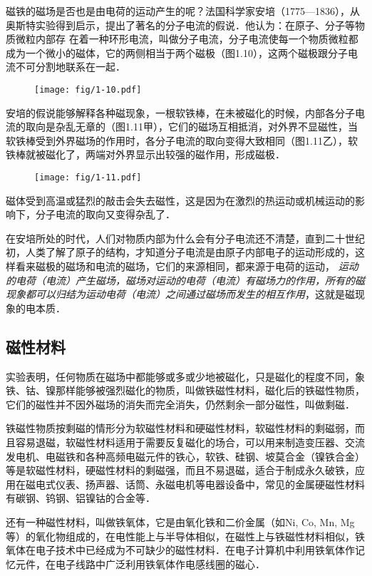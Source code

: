 磁铁的磁场是否也是由电荷的运动产生的呢？法国科学家安培（1775—1836），从奥斯特实验得到启示，提出了著名的分子电流的假说．他认为：在原子、分子等物质微粒内部存
在着一种环形电流，叫做分子电流，分子电流使每一个物质微粒都成为一个微小的磁体，它的两侧相当于两个磁极（图1.10），这两个磁极跟分子电流不可分割地联系在一起．

\begin{figure}[htp]\centering
\texttt{[image: fig/1-10.pdf]}
\caption{}
\end{figure}

安培的假说能够解释各种磁现象，一根软铁棒，在未被磁化的时候，内部各分子电流的取向是杂乱无章的（图1.11甲），它们的磁场互相抵消，对外界不显磁性，当软铁棒受到外界磁场的作用时，各分子电流的取向变得大致相同（图1.11乙），软铁棒就被磁化了，两端对外界显示出较强的磁作用，形成磁极．

\begin{figure}[htp]\centering
\texttt{[image: fig/1-11.pdf]}
\caption{}
\end{figure}

磁体受到高温或猛烈的敲击会失去磁性，这是因为在激烈的热运动或机械运动的影响下，分子电流的取向又变得杂乱了．

在安培所处的时代，人们对物质内部为什么会有分子电流还不清楚，直到二十世纪初，人类了解了原子的结构，才知道分子电流是由原子内部电子的运动形成的，这样看来磁极的磁场和电流的磁场，它们的来源相同，都来源于电荷的运动，
\textit{运动的电荷（电流）产生磁场，磁场对运动的电荷（电流）有磁场力的作用，所有的磁现象都可以归结为运动电荷（电流）之间通过磁场而发生的相互作用}，这就是磁现象的电本质．

\subsection{磁性材料}

实验表明，任何物质在磁场中都能够或多或少地被磁化，只是磁化的程度不同，象铁、钴、镍那样能够被强烈磁化的物质，叫做铁磁性材料，磁化后的铁磁性物质，它们的磁性并不因外磁场的消失而完全消失，仍然剩余一部分磁性，叫做剩磁．

铁磁性物质按剩磁的情形分为软磁性材料和硬磁性材料，软磁性材料的剩磁弱，而且容易退磁，软磁性材料适用于需要反复磁化的场合，可以用来制造变压器、交流发电机、电磁铁和各种高频电磁元件的铁心，软铁、硅钢、坡莫合金（镍铁合金）等是软磁性材料，硬磁性材料的剩磁强，而且不易退磁，适合于制成永久破铁，应用在磁电式仪表、扬声器、话筒、永磁电机等电器设备中，常见的金属硬磁性材料有碳钢、钨钢、铝镍钴的合金等．

还有一种磁性材料，叫做铁氧体，它是由氧化铁和二价金属（如Ni, Co, Mn, Mg等）的氧化物组成的，在电性能上与半导体相似，在磁性上与铁磁性材料相似，铁氧体在电子技术中已经成为不可缺少的磁性材料．在电子计算机中利用铁氧体作记忆元件，在电子线路中广泛利用铁氧体作电感线圈的磁心．

